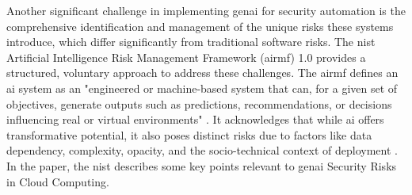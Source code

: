 Another significant challenge in implementing \gls{genai} for security automation is the comprehensive identification and management of the unique risks these systems introduce, which differ significantly from traditional software risks. The \gls{nist} Artificial Intelligence Risk Management Framework (\gls{airmf}) 1.0 \cite{tabassi_artificial_2023} provides a structured, voluntary approach to address these challenges. The \gls{airmf} defines an \gls{ai} system as an "engineered or machine-based system that can, for a given set of objectives, generate outputs such as predictions, recommendations, or decisions influencing real or virtual environments" \cite[p.1]{tabassi_artificial_2023}. It acknowledges that while \gls{ai} offers transformative potential, it also poses distinct risks due to factors like data dependency, complexity, opacity, and the socio-technical context of deployment \cite{tabassi_artificial_2023}.
In the paper, the \gls{nist} describes some key points relevant to \gls{genai} Security Risks in Cloud Computing.
